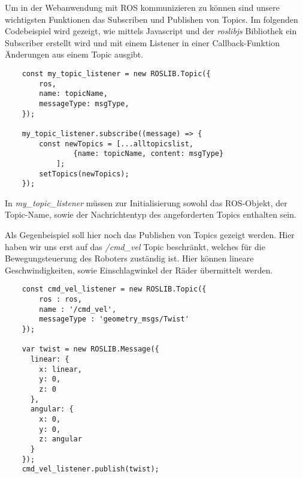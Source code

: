 \begin{flushleft}

Um in der Webanwendung mit ROS kommunizieren zu können sind unsere wichtigsten Funktionen das Subscriben und Publishen von Topics. Im folgenden Codebeispiel wird gezeigt, wie mittels Javascript und der \textit{roslibjs} Bibliothek ein Subscriber erstellt wird und mit einem Listener in einer Callback-Funktion Änderungen aus einem Topic ausgibt.

\begin{lstlisting}
    const my_topic_listener = new ROSLIB.Topic({
        ros,
        name: topicName,
        messageType: msgType,
    });

    my_topic_listener.subscribe((message) => {
        const newTopics = [...alltopicslist, 
                {name: topicName, content: msgType}
            ];
        setTopics(newTopics);
    });
\end{lstlisting}

In \textit{my\_topic\_listener} müssen zur Initialisierung sowohl das ROS-Objekt, der Topic-Name, sowie der Nachrichtentyp des angeforderten Topics enthalten sein.

Als Gegenbeispiel soll hier noch das Publishen von Topics gezeigt werden. Hier haben wir uns erst auf das \textit{/cmd\_vel} Topic beschränkt, welches für die Bewegungsteuerung des Roboters zuständig ist. Hier können lineare Geschwindigkeiten, sowie Einschlagwinkel der Räder übermittelt werden.

\begin{lstlisting}
    const cmd_vel_listener = new ROSLIB.Topic({
        ros : ros,
        name : '/cmd_vel',
        messageType : 'geometry_msgs/Twist'
    });

    var twist = new ROSLIB.Message({
      linear: {
        x: linear,
        y: 0,
        z: 0
      },
      angular: {
        x: 0,
        y: 0,
        z: angular
      }
    });
    cmd_vel_listener.publish(twist);
\end{lstlisting}

\end{flushleft}